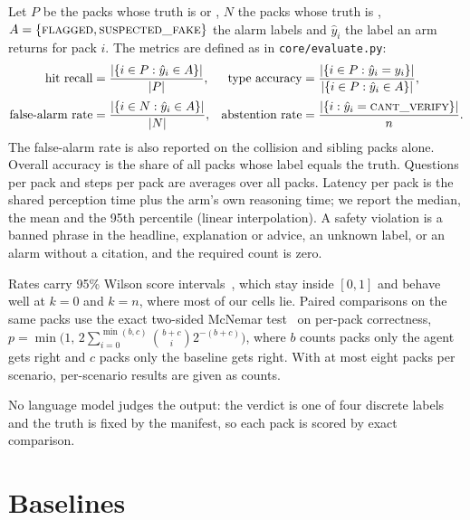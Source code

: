 Let $P$ be the packs whose truth is \FLAGGED{} or \SFAKE{}, $N$ the packs whose truth is \NLISTED{},
$A=\{\textsc{flagged},\textsc{suspected\_fake}\}$ the alarm labels and $\hat{y}_i$ the label an arm returns for pack $i$. The
metrics are defined as in \texttt{core/evaluate.py}:
\begin{align*}
\text{hit recall} &= \frac{|\{i\in P:\hat{y}_i\in A\}|}{|P|}, &
\text{type accuracy} &= \frac{|\{i\in P:\hat{y}_i=y_i\}|}{|\{i\in P:\hat{y}_i\in A\}|},\\[2pt]
\text{false-alarm rate} &= \frac{|\{i\in N:\hat{y}_i\in A\}|}{|N|}, &
\text{abstention rate} &= \frac{|\{i:\hat{y}_i=\textsc{cant\_verify}\}|}{n}.
\end{align*}
The false-alarm rate is also reported on the collision and sibling packs alone. Overall accuracy is
the share of all packs whose label equals the truth. Questions per pack and steps per pack are
averages over all packs. Latency per pack is the shared perception time plus the arm's own reasoning
time; we report the median, the mean and the 95th percentile (linear interpolation). A safety
violation is a banned phrase in the headline, explanation or advice, an unknown label, or an alarm
without a citation, and the required count is zero.

Rates carry 95\% Wilson score intervals~\cite{wilson1927probable,brown2001interval}, which stay
inside $[0,1]$ and behave well at $k=0$ and $k=n$, where most of our cells lie. Paired comparisons
on the same packs use the exact two-sided McNemar test~\cite{mcnemar1947note,dietterich1998approximate}
on per-pack correctness, $p=\min\bigl(1,\,2\sum_{i=0}^{\min(b,c)}\binom{b+c}{i}2^{-(b+c)}\bigr)$,
where $b$ counts packs only the agent gets right and $c$ packs only the baseline gets right. With at
most eight packs per scenario, per-scenario results are given as counts.

No language model judges the output: the verdict is one of four discrete labels and the truth is
fixed by the manifest, so each pack is scored by exact comparison.

\section{Baselines}
\label{sec:eval-baselines}

